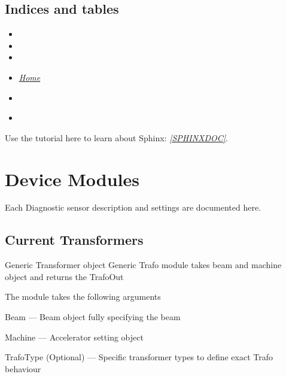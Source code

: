 \documentclass[letterpaper,10pt,english]{sphinxmanual}
\begin{document}
\subsection{Indices and tables}
\label{machine:indices-and-tables}\begin{itemize}
\item {} 

\item {} 

\item {} 

\item {} 
{\hyperref[index::doc]{\emph{\emph{Home}}}}

\item {} 
{\hyperref[index:index-label]{\emph{}}}

\item {} 
{\hyperref[beam:beam-label]{\emph{}}}

\end{itemize}

Use the tutorial here to learn about Sphinx: \label{machine:id1}{\hyperref[machine:sphinxdoc]{\emph{{[}SPHINXDOC{]}}}}.


\section{Device Modules}
\label{device_modules:device-modules}\label{device_modules::doc}
Each Diagnostic sensor description and settings are documented here.


\subsection{Current Transformers}
\label{device_modules:current-transformers}
Generic Transformer object
\label{device_modules:module-TrafoModule}
Generic Trafo module takes beam and machine object and returns the TrafoOut

The module takes the following arguments

Beam --- Beam object fully specifying the beam

Machine --- Accelerator setting object

TrafoType (Optional) --- Specific transformer types to define exact Trafo behaviour
\end{document}
